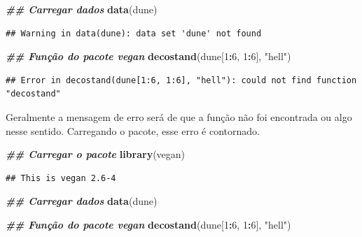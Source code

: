 \documentclass[
]{article}
\newenvironment{Shaded}{\begin{snugshade}}{\end{snugshade}}
\newcommand{\DecValTok}[1]{\textcolor[rgb]{0.00,0.00,0.81}{#1}}
\newcommand{\DocumentationTok}[1]{\textcolor[rgb]{0.56,0.35,0.01}{\textbf{\textit{#1}}}}
\newcommand{\FunctionTok}[1]{\textcolor[rgb]{0.13,0.29,0.53}{\textbf{#1}}}
\newcommand{\NormalTok}[1]{#1}
\newcommand{\SpecialCharTok}[1]{\textcolor[rgb]{0.81,0.36,0.00}{\textbf{#1}}}
\newcommand{\StringTok}[1]{\textcolor[rgb]{0.31,0.60,0.02}{#1}}
\begin{document}
\begin{Shaded}
\begin{Highlighting}[]
\DocumentationTok{\#\# Carregar dados}
\FunctionTok{data}\NormalTok{(dune)}
\end{Highlighting}
\end{Shaded}

\begin{verbatim}
## Warning in data(dune): data set 'dune' not found
\end{verbatim}

\begin{Shaded}
\begin{Highlighting}[]
\DocumentationTok{\#\# Função do pacote vegan}
\FunctionTok{decostand}\NormalTok{(dune[}\DecValTok{1}\SpecialCharTok{:}\DecValTok{6}\NormalTok{, }\DecValTok{1}\SpecialCharTok{:}\DecValTok{6}\NormalTok{], }\StringTok{"hell"}\NormalTok{)}
\end{Highlighting}
\end{Shaded}

\begin{verbatim}
## Error in decostand(dune[1:6, 1:6], "hell"): could not find function "decostand"
\end{verbatim}

Geralmente a mensagem de erro será de que a função não foi encontrada ou algo nesse sentido. Carregando o pacote, esse erro é contornado.

\begin{Shaded}
\begin{Highlighting}[]
\DocumentationTok{\#\# Carregar o pacote}
\FunctionTok{library}\NormalTok{(vegan)}
\end{Highlighting}
\end{Shaded}

\begin{verbatim}
## This is vegan 2.6-4
\end{verbatim}

\begin{Shaded}
\begin{Highlighting}[]
\DocumentationTok{\#\# Carregar dados}
\FunctionTok{data}\NormalTok{(dune)}

\DocumentationTok{\#\# Função do pacote vegan}
\FunctionTok{decostand}\NormalTok{(dune[}\DecValTok{1}\SpecialCharTok{:}\DecValTok{6}\NormalTok{, }\DecValTok{1}\SpecialCharTok{:}\DecValTok{6}\NormalTok{], }\StringTok{"hell"}\NormalTok{)}
\end{Highlighting}
\end{Shaded}
\end{document}
